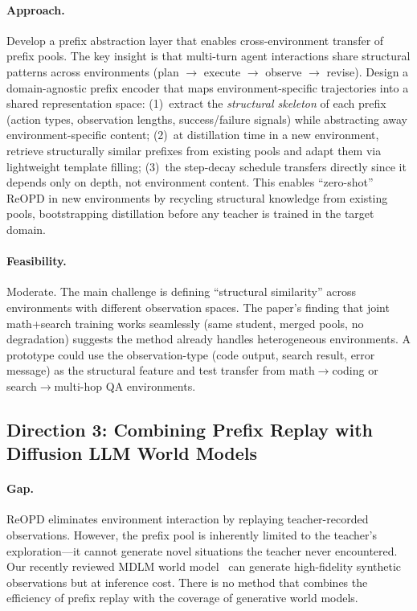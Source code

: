 \documentclass[11pt,a4paper]{article}
\begin{document}
\paragraph{Approach.}
Develop a prefix abstraction layer that enables cross-environment transfer of prefix pools. The key insight is that multi-turn agent interactions share structural patterns across environments (plan $\to$ execute $\to$ observe $\to$ revise). Design a domain-agnostic prefix encoder that maps environment-specific trajectories into a shared representation space: (1)~extract the \emph{structural skeleton} of each prefix (action types, observation lengths, success/failure signals) while abstracting away environment-specific content; (2)~at distillation time in a new environment, retrieve structurally similar prefixes from existing pools and adapt them via lightweight template filling; (3)~the step-decay schedule transfers directly since it depends only on depth, not environment content. This enables ``zero-shot'' ReOPD in new environments by recycling structural knowledge from existing pools, bootstrapping distillation before any teacher is trained in the target domain.

\paragraph{Feasibility.}
Moderate. The main challenge is defining ``structural similarity'' across environments with different observation spaces. The paper's finding that joint math+search training works seamlessly (same student, merged pools, no degradation) suggests the method already handles heterogeneous environments. A prototype could use the observation-type (code output, search result, error message) as the structural feature and test transfer from math$\to$coding or search$\to$multi-hop QA environments.

\subsection{Direction 3: Combining Prefix Replay with Diffusion LLM World Models}

\paragraph{Gap.}
ReOPD eliminates environment interaction by replaying teacher-recorded observations. However, the prefix pool is inherently limited to the teacher's exploration---it cannot generate novel situations the teacher never encountered. Our recently reviewed MDLM world model~\cite{deshpande2026masked} can generate high-fidelity synthetic observations but at inference cost. There is no method that combines the efficiency of prefix replay with the coverage of generative world models.
\end{document}
